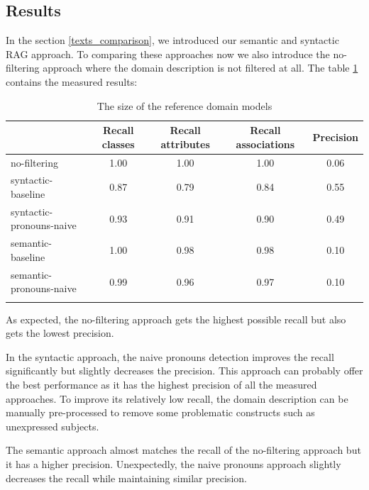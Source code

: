 \subsection{Results}

In the section \ref{texts_comparison}, we introduced our semantic and syntactic RAG approach. To comparing these approaches now we also introduce the no-filtering approach where the domain description is not filtered at all. The table \ref{tab:filtering-results} contains the measured results:

\begin{table}[!h]
    \scriptsize
    \centering
    \setlength{\tabcolsep}{0.5em}
    \begin{tabular}{lcccc}

    \toprule
         & Recall classes & Recall attributes & Recall associations & Precision \\
    \toprule
    
    \addlinespace
         no-filtering      & 1.00  & 1.00  & 1.00 & 0.06 \\
    	 syntactic-baseline & 0.87 & 0.79 & 0.84 & 0.55 \\
         syntactic-pronouns-naive & 0.93  & 0.91  & 0.90 & 0.49 \\
         semantic-baseline & 1.00 & 0.98 & 0.98 & 0.10 \\
         semantic-pronouns-naive & 0.99 & 0.96 & 0.97 & 0.10 \\
    \addlinespace
    \bottomrule
    \addlinespace
    \end{tabular}
    \caption{The size of the reference domain models}
    \label{tab:filtering-results}
\end{table}

As expected, the no-filtering approach gets the highest possible recall but also gets the lowest precision.

In the syntactic approach, the naive pronouns detection improves the recall significantly but slightly decreases the precision. This approach can probably offer the best performance as it has the highest precision of all the measured approaches. To improve its relatively low recall, the domain description can be manually pre-processed to remove some problematic constructs such as unexpressed subjects.

The semantic approach almost matches the recall of the no-filtering approach but it has a higher precision. Unexpectedly, the naive pronouns approach slightly decreases the recall while maintaining similar precision.

